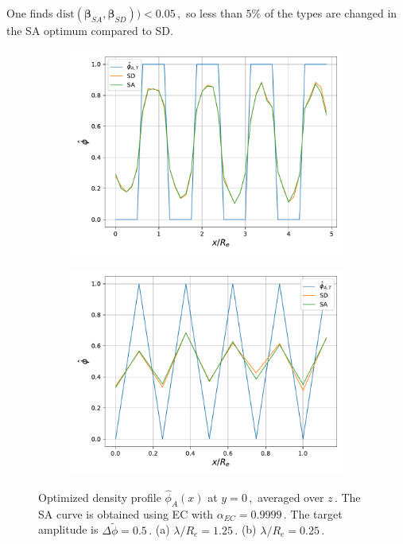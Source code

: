 \documentclass[bachelor,       %
               oneside,        %
               BCOR10mm,       %
               ngerman, english %
               ]{GAUBM}
\begin{document}
One finds $\mathrm{dist}(\pmb\beta_{SA},\pmb\beta_{SD}))<0.05\,,$ so less than $5\%$ of the types are changed in the \ac{SA} optimum compared to \ac{SD}.

\begin{figure}[H]
  \centering
  \begin{subfigure}[b]{0.45\textwidth}
      \centering
      \includegraphics[width=\textwidth]{figures/amplitude_lam1p25_dphi0.5_alpha0.999_seed0.pdf}
      \caption{}
      \label{fig:amplitude_sa_sd_lam1.25}
  \end{subfigure}
    \hfill
  \begin{subfigure}[b]{0.45\textwidth}
      \centering
      \includegraphics[width=\textwidth]{figures/amplitude_lam0p25_dphi0.5_alpha0.9999_seed0.pdf}
      \caption{}
      \label{fig:amplitude_sa_sd_lam0.25}
  \end{subfigure}
     \caption{Optimized density profile $\hat\phi_A(x)$ at $y=0\,,$ averaged over $z\,.$  The \ac{SA} curve is obtained using \ac{EC} with $\alpha_{EC}=0.9999\,.$ The target amplitude is $\Delta\tilde\phi=0.5\,.$ (a) $\lambda/R_e=1.25\,.$ (b) $\lambda/R_e=0.25\,.$}
     \label{fig:amplitude_sa_sd}
\end{figure}
\end{document}
